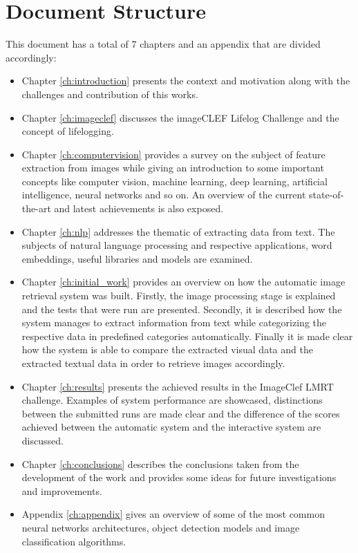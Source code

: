 \section{Document Structure}
This document has a total of 7 chapters and an appendix that are divided accordingly:




\begin{itemize}
  \item Chapter \ref{ch:introduction} presents the context and motivation along with the challenges and contribution of this works.
  \item Chapter \ref{ch:imageclef} discusses the imageCLEF Lifelog Challenge and the concept of lifelogging.
  \item Chapter \ref{ch:computervision} provides a survey on the subject of feature extraction from images while giving an introduction to some important concepts like computer vision, machine learning, deep learning, artificial intelligence, neural networks and so on. An overview of the current state-of-the-art and latest achievements is also exposed.
  
  \item Chapter \ref{ch:nlp} addresses the thematic of extracting data from text. The subjects of natural language processing and respective applications, word embeddings, useful libraries and models are examined.  
  
  
  \item Chapter \ref{ch:initial_work} provides an overview on how the automatic image retrieval system was built. Firstly, the image processing stage is explained and the tests that were run are presented. Secondly, it is described how the system manages to extract information from text while categorizing the respective data in predefined categories automatically. Finally it is made clear how the system is able to compare the extracted visual data and the extracted textual data in order to retrieve images accordingly.
  


  \item Chapter \ref{ch:results} presents the achieved results in the ImageClef LMRT challenge. Examples of system performance are showcased, distinctions between the submitted runs are made clear and the difference of the scores achieved between the automatic system and the interactive system are discussed.
  
  \item Chapter \ref{ch:conclusions} describes the conclusions taken from the development of the work and provides some ideas for future investigations and improvements.
  
  \item Appendix \ref{ch:appendix} gives an overview of some of the most common neural networks architectures, object detection models and image classification algorithms.
 
 
\end{itemize}

